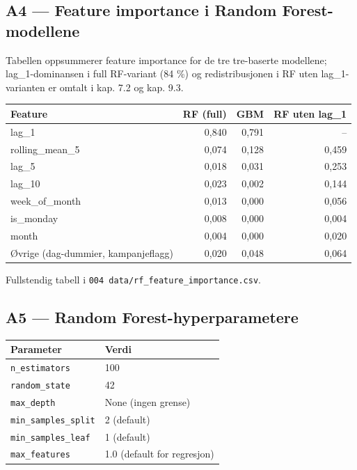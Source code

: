 \documentclass[
  norsk,
  11pt,
  a4paper,
]{article}
\newcounter{none} %
\begin{document}
\subsection{A4 --- Feature importance i Random
Forest-modellene}\label{a4-feature-importance-i-random-forest-modellene}

Tabellen oppsummerer feature importance for de tre tre-baserte
modellene; lag\_1-dominansen i full RF-variant (84 \%) og
redistribusjonen i RF uten lag\_1-varianten er omtalt i kap. 7.2 og kap.
9.3.

{\def\LTcaptype{none} %
\begin{longtable}[]{@{}lrrr@{}}
\toprule\noalign{}
Feature & RF (full) & GBM & RF uten lag\_1 \\
\midrule\noalign{}
\endhead
\bottomrule\noalign{}
\endlastfoot
lag\_1 & 0,840 & 0,791 & -- \\
rolling\_mean\_5 & 0,074 & 0,128 & 0,459 \\
lag\_5 & 0,018 & 0,031 & 0,253 \\
lag\_10 & 0,023 & 0,002 & 0,144 \\
week\_of\_month & 0,013 & 0,000 & 0,056 \\
is\_monday & 0,008 & 0,000 & 0,004 \\
month & 0,004 & 0,000 & 0,020 \\
Øvrige (dag-dummier, kampanjeflagg) & 0,020 & 0,048 & 0,064 \\
\end{longtable}
}

Fullstendig tabell i \texttt{004\ data/rf\_feature\_importance.csv}.

\subsection{A5 --- Random
Forest-hyperparametere}\label{a5-random-forest-hyperparametere}

{\def\LTcaptype{none} %
\begin{longtable}[]{@{}ll@{}}
\toprule\noalign{}
Parameter & Verdi \\
\midrule\noalign{}
\endhead
\bottomrule\noalign{}
\endlastfoot
\texttt{n\_estimators} & 100 \\
\texttt{random\_state} & 42 \\
\texttt{max\_depth} & None (ingen grense) \\
\texttt{min\_samples\_split} & 2 (default) \\
\texttt{min\_samples\_leaf} & 1 (default) \\
\texttt{max\_features} & 1.0 (default for regresjon) \\
\end{longtable}
}
\end{document}
